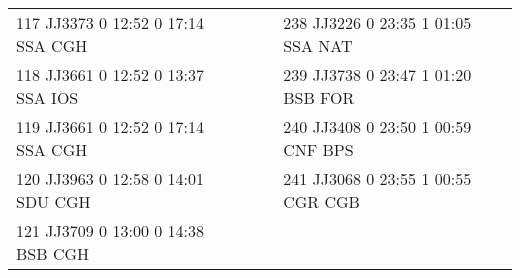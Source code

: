 \begin{scriptsize}
\begin{longtable}{l c c l}
117 JJ3373 0 12:52 0 17:14 SSA CGH & & & 238 JJ3226 0 23:35 1 01:05 SSA NAT \\

118 JJ3661 0 12:52 0 13:37 SSA IOS & & & 239 JJ3738 0 23:47 1 01:20 BSB FOR \\

119 JJ3661 0 12:52 0 17:14 SSA CGH & & & 240 JJ3408 0 23:50 1 00:59 CNF BPS \\

120 JJ3963 0 12:58 0 14:01 SDU CGH & & & 241 JJ3068 0 23:55 1 00:55 CGR CGB \\

121 JJ3709 0 13:00 0 14:38 BSB CGH & & & \\


\end{longtable}

\end{scriptsize}
